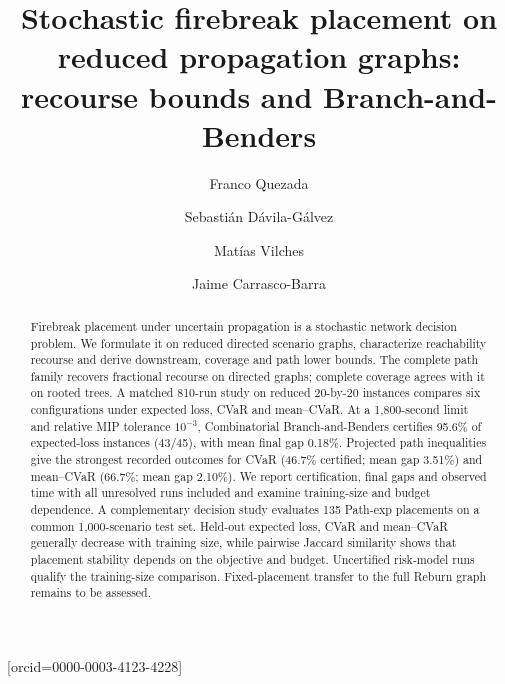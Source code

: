 \documentclass[a4paper,fleqn]{cas-sc}
\begin{document}
\let\WriteBookmarks\relax
{}
\title[mode=title]{Stochastic firebreak placement on reduced propagation graphs: recourse bounds and Branch-and-Benders}

\author[2,4]{Franco Quezada}
\cormark[1]
\author[2,4]{Sebasti\'an D\'avila-G\'alvez}
\author[2]{Mat\'ias Vilches}
\author[1,5]{Jaime Carrasco-Barra}[orcid=0000-0003-4123-4228]

\address[1]{Departamento de Industria, Facultad de Ingenier\'ia, Universidad Tecnol\'ogica Metropolitana, Santiago, Chile}
\address[2]{Industrial Engineering Department, Faculty of Engineering, University of Santiago of Chile, Santiago, Chile}
\address[3]{Industrial Engineering Department, University of Chile, Santiago, Chile}
\address[4]{Program for the Development of Sustainable Production Systems, Faculty of Engineering, University of Santiago of Chile, Santiago, Chile}
\address[5]{Complex Engineering System Institute -- ISCI, Santiago, Chile}

\begin{abstract}
Firebreak placement under uncertain propagation is a stochastic network
decision problem. We formulate it on reduced directed scenario graphs,
characterize reachability recourse and derive downstream, coverage and
path lower bounds. The complete path family recovers fractional recourse
on directed graphs; complete coverage agrees with it on rooted trees.
A matched 810-run study on reduced 20-by-20 instances compares six
configurations under expected loss, CVaR and mean--CVaR. At a 1,800-second
limit and relative MIP tolerance $10^{-3}$, Combinatorial Branch-and-Benders
certifies 95.6\% of expected-loss instances (43/45), with mean final gap 0.18\%.
Projected path inequalities give the strongest recorded outcomes for
CVaR (46.7\% certified; mean gap 3.51\%) and mean--CVaR (66.7\%; mean
gap 2.10\%). We report certification, final gaps and observed time
with all unresolved runs included and examine training-size and budget
dependence. A complementary decision study evaluates 135 Path-exp
placements on a common 1,000-scenario test set. Held-out expected loss,
CVaR and mean--CVaR generally decrease with training size, while
pairwise Jaccard similarity shows that placement stability depends on
the objective and budget. Uncertified risk-model runs qualify the
training-size comparison. Fixed-placement transfer to the full Reburn
graph remains to be assessed.
\end{abstract}
\end{document}

